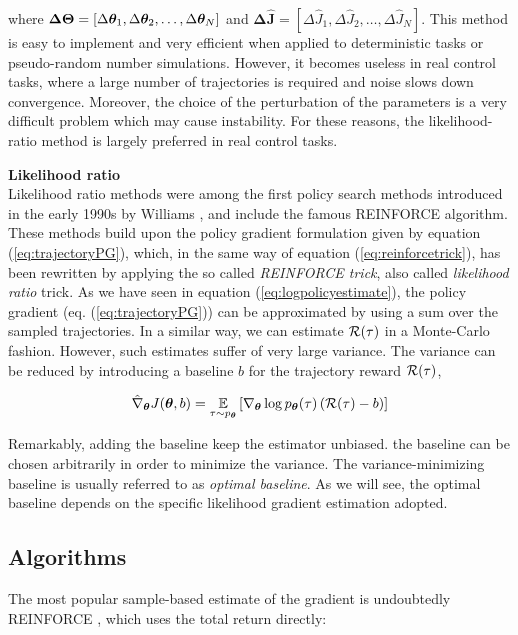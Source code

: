 where $\boldsymbol{\Delta\Theta}=[\Delta\boldsymbol{\theta}_1, \Delta\boldsymbol{\theta}_2, \dots, \Delta\boldsymbol{\theta}_N]$ and $\boldsymbol{\Delta\hat{J}}=[\Delta\hat{J}_1,\Delta\hat{J}_2,\dots,\Delta\hat{J}_N]$. This method
is easy to implement and very efficient when applied to deterministic tasks or pseudo-random number simulations. However, it becomes useless in real control tasks, where a large number of trajectories is required and noise slows down convergence. Moreover, the choice of the perturbation of the parameters is a very difficult problem which may cause instability. For these reasons, the likelihood-ratio method is largely preferred in real control tasks.

\textbf{Likelihood ratio}\\
Likelihood ratio methods were among the first policy search methods
introduced in the early 1990s by Williams \cite{williams1992simple}, and include the famous REINFORCE algorithm. These methods build upon the policy gradient formulation given by equation (\ref{eq:trajectoryPG}), which, in the same way of equation (\ref{eq:reinforcetrick}), has been rewritten by applying the so called \emph{REINFORCE trick}, also called \emph{likelihood ratio} trick. As we have seen in equation (\ref{eq:logpolicyestimate}), the policy gradient (eq. (\ref{eq:trajectoryPG})) can be approximated by using a sum over the sampled trajectories. In a similar way, we can estimate $\mathcal{R}(\tau)$ in a Monte-Carlo fashion. However, such estimates suffer of very large variance. The variance can be reduced by introducing a baseline $b$ for the trajectory reward $\mathcal{R}(\tau)$, \ie

\begin{align}
\hat{\nabla}_{\boldsymbol{\theta}}J(\boldsymbol{\theta}, b) = \underset{\tau\sim p_{\boldsymbol{\theta}}}{\mathbb{E}}\left[{\nabla_{\boldsymbol{\theta}}\log p_{\boldsymbol{\theta}}(\tau)\left(\mathcal{R}(\tau)-b\right)}\right] \label{eq:PGbaseline}
\end{align}

Remarkably, adding the baseline keep the estimator unbiased. the baseline can be chosen arbitrarily in order to minimize the variance. The variance-minimizing baseline is usually referred to as \emph{optimal baseline}.  As we will see, the optimal baseline depends on the specific likelihood gradient estimation adopted.

\subsection{Algorithms}
The most popular sample-based estimate of the gradient is undoubtedly REINFORCE \cite{williams1992simple}, which uses the total return directly:

